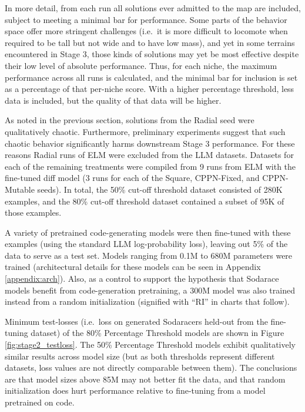 \documentclass{article}
\begin{document}
In more detail, from each run all solutions ever admitted to the map are included, subject to meeting a minimal bar for performance. Some parts of the behavior space offer more stringent challenges (i.e.\ it is more difficult to locomote when required to be tall but not wide and to have low mass), and yet in some terrains encountered in Stage 3, those kinds of solutions may yet be most effective despite their low level of absolute performance. Thus, for each niche, the maximum performance across all runs is calculated, and the minimal bar for inclusion is set as a percentage of that per-niche score. With a higher percentage threshold, less data is included, but the quality of that data will be higher.






As noted in the previous section, solutions from the Radial seed were qualitatively chaotic. Furthermore, preliminary experiments suggest that such chaotic behavior significantly harms downstream Stage 3 performance. For these reasons Radial runs of ELM were excluded from the LLM datasets. Datasets for each of the remaining treatments were compiled from 9 runs from ELM with the fine-tuned diff model (3 runs for each of the Square, CPPN-Fixed, and CPPN-Mutable seeds). In total, the 50\% cut-off threshold dataset consisted of 280K examples, and the 80\% cut-off threshold dataset contained a subset of 95K of those examples.

A variety of pretrained code-generating models were then fine-tuned with these examples (using the standard LLM log-probability loss), leaving out 5\% of the data to serve as a test set. Models ranging from 0.1M to 680M parameters were trained (architectural details for these models can be seen in Appendix \ref{appendix:arch}).
Also, as a control to support the hypothesis that Sodarace models benefit from code-generation pretraining, a 300M model was also trained instead from a random initialization (signified with ``RI'' in charts that follow).

Minimum test-losses (i.e.\ loss on generated Sodaracers held-out from the fine-tuning dataset) of the 80\% Percentage Threshold models are shown in Figure \ref{fig:stage2_testloss}. The 50\% Percentage Threshold models exhibit qualitatively similar results across model size (but as both thresholds represent different datasets, loss values are not directly comparable between them). The conclusions are that model sizes above 85M may not better fit the data, and that random initialization does hurt performance relative to fine-tuning from a model pretrained on code.
\end{document}
